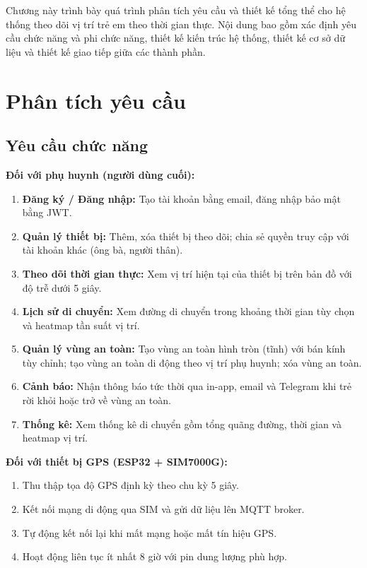 \documentclass[../DoAn.tex]{subfiles}
\begin{document}
Chương này trình bày quá trình phân tích yêu cầu và thiết kế tổng thể cho hệ thống theo dõi vị trí trẻ em theo thời gian thực. Nội dung bao gồm xác định yêu cầu chức năng và phi chức năng, thiết kế kiến trúc hệ thống, thiết kế cơ sở dữ liệu và thiết kế giao tiếp giữa các thành phần.

\section{Phân tích yêu cầu}

\subsection{Yêu cầu chức năng}

\textbf{Đối với phụ huynh (người dùng cuối):}

\begin{enumerate}
  \item \textbf{Đăng ký / Đăng nhập:} Tạo tài khoản bằng email, đăng nhập bảo mật bằng JWT.
  \item \textbf{Quản lý thiết bị:} Thêm, xóa thiết bị theo dõi; chia sẻ quyền truy cập với tài khoản khác (ông bà, người thân).
  \item \textbf{Theo dõi thời gian thực:} Xem vị trí hiện tại của thiết bị trên bản đồ với độ trễ dưới 5 giây.
  \item \textbf{Lịch sử di chuyển:} Xem đường di chuyển trong khoảng thời gian tùy chọn và heatmap tần suất vị trí.
  \item \textbf{Quản lý vùng an toàn:} Tạo vùng an toàn hình tròn (tĩnh) với bán kính tùy chỉnh; tạo vùng an toàn di động theo vị trí phụ huynh; xóa vùng an toàn.
  \item \textbf{Cảnh báo:} Nhận thông báo tức thời qua in-app, email và Telegram khi trẻ rời khỏi hoặc trở về vùng an toàn.
  \item \textbf{Thống kê:} Xem thống kê di chuyển gồm tổng quãng đường, thời gian và heatmap vị trí.
\end{enumerate}

\textbf{Đối với thiết bị GPS (ESP32 + SIM7000G):}

\begin{enumerate}
  \item Thu thập tọa độ GPS định kỳ theo chu kỳ 5 giây.
  \item Kết nối mạng di động qua SIM và gửi dữ liệu lên MQTT broker.
  \item Tự động kết nối lại khi mất mạng hoặc mất tín hiệu GPS.
  \item Hoạt động liên tục ít nhất 8 giờ với pin dung lượng phù hợp.
\end{enumerate}
\end{document}
